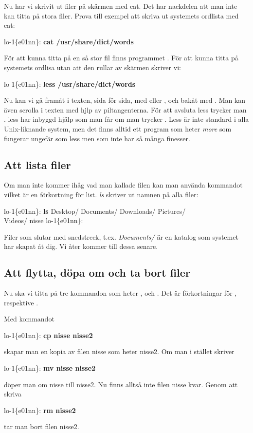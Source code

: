 \documentclass[a4paper,twocolumn]{book}
\begin{document}
Nu har vi skrivit ut filer på skärmen med cat. Det har nackdelen att man
inte kan titta på stora filer. Prova till exempel att skriva ut systemets
ordlista med cat:

\begin{example}
lo-1\{e01nn\}: \textbf{cat /usr/share/dict/words}
\end{example}

För att kunna titta på en så stor fil finns programmet . För att
kunna titta på systemets ordlisa utan att den rullar av skärmen skriver vi:

\begin{example}
lo-1\{e01nn\}: \textbf{less /usr/share/dict/words}
\end{example}

Nu kan vi gå framåt i texten, sida för sida, med  eller
, och bakåt med . Man kan även scrolla i texten med hjlp av piltangenterna. För att avsluta less trycker man .
less har inbyggd hjälp som man får om man trycker .
Less är inte standard i alla Unix-liknande system, men det finns alltid ett
program som heter \emph{more} som fungerar ungefär som less men som
inte har så många finesser.

\subsection{Att lista filer}

Om man inte kommer ihåg vad man kallade filen kan man använda
kommandot  vilket är en förkortning för list. \emph{ls}
skriver ut namnen på alla filer:
\begin{example}
lo-1\{e01nn\}: \textbf{ls}
Desktop/ Documents/ Downloads/ Pictures/\\Videos/   nisse
lo-1\{e01nn\}: 
\end{example}
Filer som slutar med snedstreck, t.ex. \emph{Documents/} är en katalog som systemet har skapat åt
dig. Vi åter kommer till dessa senare.

\subsection{Att flytta, döpa om och ta bort filer}

Nu ska vi titta på tre kommandon som heter , 
och . Det är förkortningar för ,  respektive
.

Med kommandot
\begin{example}
lo-1\{e01nn\}: \textbf{cp nisse nisse2}
\end{example}
skapar man en kopia av filen nisse som heter nisse2. Om man i stället
skriver
\begin{example}
lo-1\{e01nn\}: \textbf{mv nisse nisse2}
\end{example}
döper man om nisse till nisse2. Nu finns alltså inte filen nisse kvar.
Genom att skriva
\begin{example}
lo-1\{e01nn\}: \textbf{rm nisse2}
\end{example}
tar man bort filen nisse2.
\end{document}

